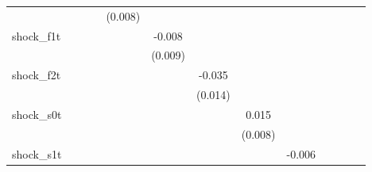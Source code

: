 {\begin{tabular}{l*{12}{c}}
            &                     &                     &                     &     (0.008)         &                     &                     &                     &                     &                     &                     &                     &                     \\
\addlinespace
shock\_f1t   &                     &                     &                     &                     &      -0.008         &                     &                     &                     &                     &                     &                     &                     \\
            &                     &                     &                     &                     &     (0.009)         &                     &                     &                     &                     &                     &                     &                     \\
\addlinespace
shock\_f2t   &                     &                     &                     &                     &                     &      -0.035\sym{**} &                     &                     &                     &                     &                     &                     \\
            &                     &                     &                     &                     &                     &     (0.014)         &                     &                     &                     &                     &                     &                     \\
\addlinespace
shock\_s0t   &                     &                     &                     &                     &                     &                     &       0.015\sym{*}  &                     &                     &                     &                     &                     \\
            &                     &                     &                     &                     &                     &                     &     (0.008)         &                     &                     &                     &                     &                     \\
\addlinespace
shock\_s1t   &                     &                     &                     &                     &                     &                     &                     &      -0.006         &                     &                     &                     &                     \\

\end{tabular}}
